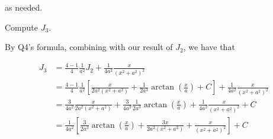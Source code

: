\documentclass{homework}
\newcommand{\?}{\stackrel{?}{=}}
\theoremstyle{definition}
\begin{document}
as needed.

\newpage
\question Compute $J_{3}$.

By Q4's formula, combining with our result of $J_2$, we have that

\begin{align*}
    J_3&=\frac{4-1}{4}\frac{1}{a^2}J_2+\frac{1}{4a^2}\frac{x}{(x^2+a^2)^2}\\
    &=\frac{4-1}{4}\frac{1}{a^2}[\frac{x}{2a^2(x^2+a^2)}+\frac{1}{2a^3}\arctan(\frac{x}a) + C]+\frac{1}{4a^2}\frac{x}{(x^2+a^2)^2}\\
    &=\frac{3}{4a^2}\frac{x}{2a^2(x^2+a^2)}+\frac{3}{4a^2}\frac{1}{2a^3}\arctan(\frac{x}a)+\frac{1}{4a^2}\frac{x}{(x^2+a^2)^2} + C\\
    &=\frac{1}{4a^2}\left[\frac{3}{2a^3}\arctan(\frac{x}a)+\frac{3x}{2a^2(x^2+a^2)}+\frac{x}{(x^2+a^2)^2}\right] + C\\
\end{align*}
\end{document}
